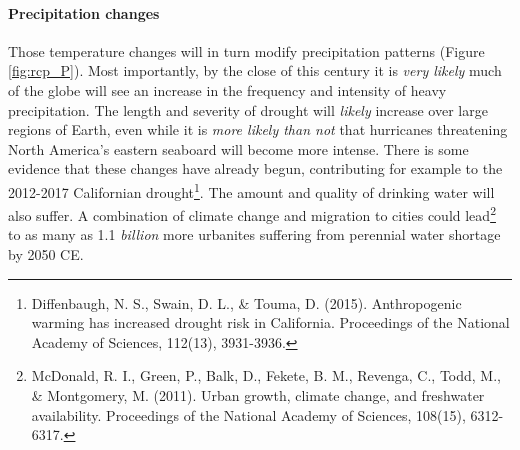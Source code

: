\documentclass[amstex,12pt]{book}
\begin{document}
\paragraph{Precipitation changes}
Those temperature changes will in turn modify precipitation patterns  (Figure \ref{fig:rcp_P}). Most importantly, by the close of this century it is \emph{very likely} much of the globe will see an increase in the frequency and intensity of heavy precipitation. The length and severity of drought will \emph{likely} increase over large regions of Earth, even while it is \emph{more likely than not} that hurricanes threatening North America's eastern seaboard will become more intense. There is some evidence that these changes have already begun, contributing for example to the 2012-2017 Californian drought\footnote{Diffenbaugh, N. S., Swain, D. L., \& Touma, D. (2015). Anthropogenic warming has increased drought risk in California. Proceedings of the National Academy of Sciences, 112(13), 3931-3936.}. The amount and quality of drinking water will also suffer. A combination of climate change and migration to cities could lead\footnote{McDonald, R. I., Green, P., Balk, D., Fekete, B. M., Revenga, C., Todd, M., \& Montgomery, M. (2011). Urban growth, climate change, and freshwater availability. Proceedings of the National Academy of Sciences, 108(15), 6312-6317.} to as many as 1.1 \emph{billion} more urbanites suffering from perennial water shortage  by 2050 CE.   
 
\end{document}
